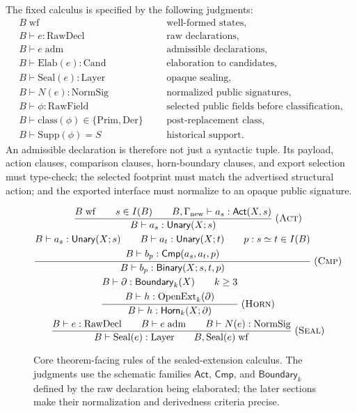 \documentclass{lmcs}
\newcommand{\RawDecl}{\mathrm{RawDecl}}
\newcommand{\Layer}{\mathrm{Layer}}
\newcommand{\NormSig}{\mathrm{NormSig}}
\newcommand{\Prim}{\mathrm{Prim}}
\newcommand{\Der}{\mathrm{Der}}
\newcommand{\Supp}{\mathrm{Supp}}
\newcommand{\OpenExt}{\mathrm{OpenExt}}
\begin{document}
The fixed calculus is specified by the following judgments:
\[
\begin{array}{rcll}
  B\;\mathrm{wf} &&& \text{well-formed states},\\
  B\vdash e:\mathrm{RawDecl} &&& \text{raw declarations},\\
  B\vdash e\;\mathrm{adm} &&& \text{admissible declarations},\\
  B\vdash \mathrm{Elab}(e):\mathrm{Cand} &&& \text{elaboration to candidates},\\
  B\vdash \mathrm{Seal}(e):\mathrm{Layer} &&& \text{opaque sealing},\\
  B\vdash N(e):\mathrm{NormSig} &&& \text{normalized public signatures},\\
  B\vdash \phi:\mathrm{RawField} &&& \text{selected public fields before classification},\\
  B\vdash \mathrm{class}(\phi)\in\{\Prim,\Der\}
    &&& \text{post-replacement class},\\
  B\vdash \Supp(\phi)=S &&& \text{historical support}.
\end{array}
\]
An admissible declaration is therefore not just a syntactic tuple.  Its payload, action
clauses, comparison clauses, horn-boundary clauses, and export selection must type-check;
the selected footprint must match the advertised structural action; and the exported interface
must normalize to an opaque public signature.

\begin{figure}[t]
\small
\[
\begin{array}{@{}c@{}}
\dfrac{
  B\;\mathrm{wf}
  \qquad s\in I(B)
  \qquad B,\Gamma_{\mathrm{new}}\vdash a_s:\mathsf{Act}(X,s)
}{
  B\vdash a_s:\mathsf{Unary}(X;s)
}
\;(\textsc{Act})
\\[2.2ex]
\dfrac{
  \begin{gathered}
  B\vdash a_s:\mathsf{Unary}(X;s)
  \qquad
  B\vdash a_t:\mathsf{Unary}(X;t)
  \qquad
  p:s\simeq t\in I(B)\\
  B\vdash b_p:\mathsf{Cmp}(a_s,a_t,p)
  \end{gathered}
}{
  B\vdash b_p:\mathsf{Binary}(X;s,t,p)
}
\;(\textsc{Cmp})
\\[2.2ex]
\dfrac{
  \begin{gathered}
  B\vdash \partial:\mathsf{Boundary}_k(X)
  \qquad k\geq 3\\
  B\vdash h:\OpenExt_k(\partial)
  \end{gathered}
}{
  B\vdash h:\mathsf{Horn}_k(X;\partial)
}
\;(\textsc{Horn})
\\[2.2ex]
\dfrac{
  B\vdash e:\RawDecl
  \qquad
  B\vdash e\;\mathrm{adm}
  \qquad
  B\vdash N(e):\NormSig
}{
  B\vdash \mathrm{Seal}(e):\Layer
  \qquad
  B,\mathrm{Seal}(e)\;\mathrm{wf}
}
\;(\textsc{Seal})
\end{array}
\]
\caption{Core theorem-facing rules of the sealed-extension calculus.  The
judgments use the schematic families \(\mathsf{Act}\), \(\mathsf{Cmp}\), and
\(\mathsf{Boundary}_k\) defined by the raw declaration being elaborated; the
later sections make their normalization and derivedness criteria precise.}
\label{fig:core-rules}
\end{figure}
\end{document}
